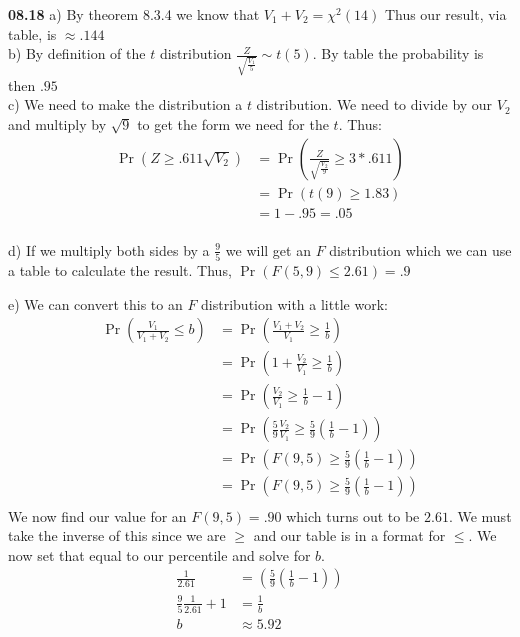 

{\bf 08.18} a) By theorem 8.3.4 we know that $V_1 + V_2 = \chi^2 (14)$ Thus our result, via table, is $\approx .144$ \\

b) By definition of the $t$ distribution $\frac{Z}{\sqrt{\frac{V_1}{5}}} \sim t(5)$. By table the probability is then $.95$ \\

c) We need to make the distribution a $t$ distribution. We need to divide by our $V_2$ and multiply by $\sqrt{9}$ to get
the form we need for the $t$. Thus: \\
\begin{align*}
	\Pr \left( Z \geq .611 \sqrt{V_2} \right) & = \Pr \left( \frac{Z}{\sqrt{\frac{V_2}{9}}} \geq 3 * .611 \right) \\
	& = \Pr \left( t(9) \geq 1.83 \right) \\
	& = 1 - .95 = .05 \\
\end{align*}

d) If we multiply both sides by a $\frac{9}{5}$ we will get an $F$ distribution which we can use a table to calculate
the result. Thus, $\Pr ( F(5,9) \leq 2.61 ) = .9$

e) We can convert this to an $F$ distribution with a little work: \\
\begin{align*}
	\Pr \left( \frac{V_1}{V_1 + V_2} \leq b \right) & = \Pr \left( \frac{V_1 + V_2}{V_1} \geq \frac{1}{b} \right) \\
	& = \Pr \left( 1 + \frac{V_2}{V_1} \geq \frac{1}{b} \right) \\
	& = \Pr \left( \frac{V_2}{V_1} \geq \frac{1}{b} - 1 \right) \\
	& = \Pr \left(\frac{5}{9} \frac{V_2}{V_1} \geq \frac{5}{9}\left(\frac{1}{b} - 1 \right)\right) \\
	& = \Pr \left(F(9,5) \geq \frac{5}{9}\left(\frac{1}{b} - 1 \right)\right) \\
	& = \Pr \left(F(9,5) \geq \frac{5}{9}\left(\frac{1}{b} - 1 \right)\right) \\
\end{align*}
We now find our value for an $F(9,5) = .90$ which turns out to be $2.61$. We must take the inverse of this
since we are $\geq$ and our table is in a format for $\leq$. We now set that equal to our percentile
and solve for $b$. \\
\begin{align*}
	\frac{1}{2.61} & = \left(\frac{5}{9}\left(\frac{1}{b} - 1 \right)\right) \\
	\frac{9}{5}\frac{1}{2.61} + 1 & = \frac{1}{b} \\
	b & \approx 5.92 \\
\end{align*}




